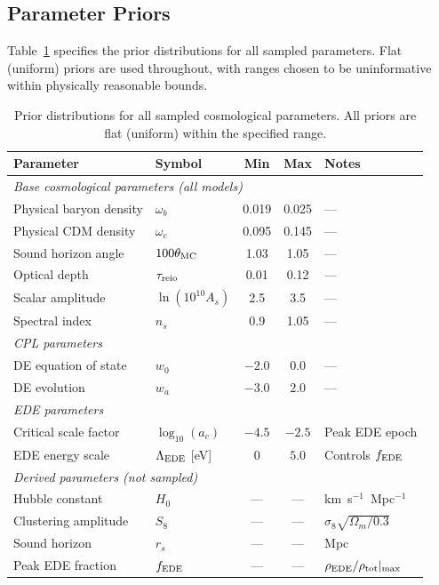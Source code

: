 \documentclass[a4paper,11pt]{article}
\begin{document}
\subsection{Parameter Priors}
\label{sec:priors}

Table~\ref{tab:full_priors} specifies the prior distributions for all sampled parameters. Flat (uniform) priors are used throughout, with ranges chosen to be uninformative within physically reasonable bounds.

\begin{table}[ht]
\centering
\caption{Prior distributions for all sampled cosmological parameters. All priors are flat (uniform) within the specified range.}
\label{tab:full_priors}
\begin{tabular}{llccl}
\toprule
\textbf{Parameter} & \textbf{Symbol} & \textbf{Min} & \textbf{Max} & \textbf{Notes} \\
\midrule
\multicolumn{5}{l}{\textit{Base cosmological parameters (all models)}} \\
Physical baryon density & $\omega_b$ & 0.019 & 0.025 & --- \\
Physical CDM density & $\omega_c$ & 0.095 & 0.145 & --- \\
Sound horizon angle & $100\theta_{\rm MC}$ & 1.03 & 1.05 & --- \\
Optical depth & $\tau_{\rm reio}$ & 0.01 & 0.12 & --- \\
Scalar amplitude & $\ln(10^{10}A_s)$ & 2.5 & 3.5 & --- \\
Spectral index & $n_s$ & 0.9 & 1.05 & --- \\
\midrule
\multicolumn{5}{l}{\textit{CPL parameters}} \\
DE equation of state & $w_0$ & $-2.0$ & $0.0$ & --- \\
DE evolution & $w_a$ & $-3.0$ & $2.0$ & --- \\
\midrule
\multicolumn{5}{l}{\textit{EDE parameters}} \\
Critical scale factor & $\log_{10}(a_c)$ & $-4.5$ & $-2.5$ & Peak EDE epoch \\
EDE energy scale & $\Lambda_{\rm EDE}$ [eV] & $0$ & $5.0$ & Controls $f_{\rm EDE}$ \\
\midrule
\multicolumn{5}{l}{\textit{Derived parameters (not sampled)}} \\
Hubble constant & $H_0$ & --- & --- & km~s$^{-1}$~Mpc$^{-1}$ \\
Clustering amplitude & $S_8$ & --- & --- & $\sigma_8\sqrt{\Omega_m/0.3}$ \\
Sound horizon & $r_s$ & --- & --- & Mpc \\
Peak EDE fraction & $f_{\rm EDE}$ & --- & --- & $\rho_{\rm EDE}/\rho_{\rm tot}|_{\rm max}$ \\
\bottomrule
\end{tabular}
\end{table}
\end{document}
